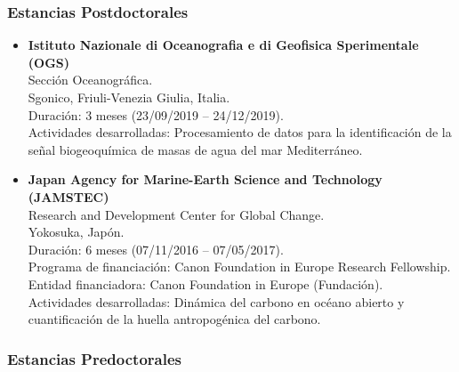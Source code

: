 \documentclass[11pt,a4paper]{article}
\begin{document}
\subsubsection{Estancias Postdoctorales}

\begin{itemize}[leftmargin=*]

    \item \textbf{Istituto Nazionale di Oceanografia e di Geofisica Sperimentale (OGS)}\\
    Sección Oceanográfica.\\
    Sgonico, Friuli-Venezia Giulia, Italia.\\
    Duración: 3 meses (23/09/2019 -- 24/12/2019).\\
    Actividades desarrolladas: Procesamiento de datos para la identificación de la señal biogeoquímica de masas de agua del mar Mediterráneo.

    \item \textbf{Japan Agency for Marine-Earth Science and Technology (JAMSTEC)}\\
    Research and Development Center for Global Change.\\
    Yokosuka, Japón.\\
    Duración: 6 meses (07/11/2016 -- 07/05/2017).\\
    Programa de financiación: Canon Foundation in Europe Research Fellowship.\\
    Entidad financiadora: Canon Foundation in Europe (Fundación).\\
    Actividades desarrolladas: Dinámica del carbono en océano abierto y cuantificación de la huella antropogénica del carbono.

\end{itemize}

\subsubsection{Estancias Predoctorales}
\end{document}
